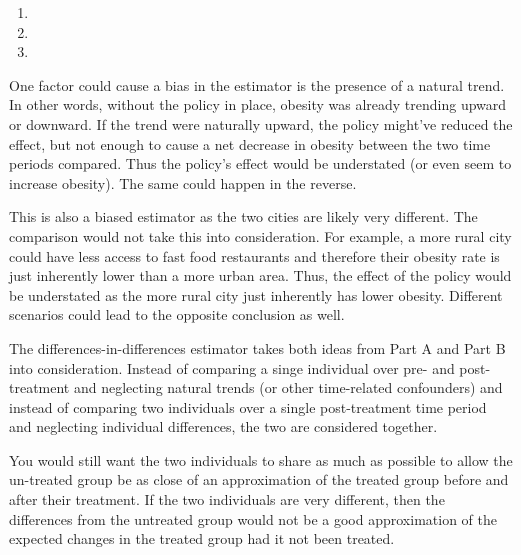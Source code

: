 \documentclass[12pt,twoside]{article}
\begin{document}
\begin{problems}
\begin{problemparts}
\problempart  %

\begin{enumerate}[label=\textbf{(\roman*)}]
    \item
    \item
    \item
\end{enumerate}

\end{problemparts}

\newpage

\problem  %

\begin{problemparts}

\problempart %

One factor could cause a bias in the estimator is the presence of a natural
trend. In other words, without the policy in place, obesity was already
trending upward or downward. If the trend were naturally upward, the policy
might've reduced the effect, but not enough to cause a net decrease in
obesity between the two time periods compared. Thus the policy's effect would
be understated (or even seem to increase obesity). The same could happen in
the reverse.

\problempart %

This is also a biased estimator as the two cities are likely very different.
The comparison would not take this into consideration. For example, a more
rural city could have less access to fast food restaurants and therefore
their obesity rate is just inherently lower than a more urban area. Thus, the
effect of the policy would be understated as the more rural city just
inherently has lower obesity. Different scenarios could lead to the opposite
conclusion as well.

\problempart %

\problempart %

The differences-in-differences estimator takes both ideas from Part A and
Part B into consideration. Instead of comparing a singe individual over pre-
and post-treatment and neglecting natural trends (or other time-related
confounders) and instead of comparing two individuals over a single
post-treatment time period and neglecting individual differences, the two are
considered together.

\problempart %

You would still want the two individuals to share as much as possible to
allow the un-treated group be as close of an approximation of the treated
group before and after their treatment. If the two individuals are very
different, then the differences from the untreated group would not be a good
approximation of the expected changes in the treated group had it not been
treated.


\end{problemparts}
\end{problems}
\end{document}
